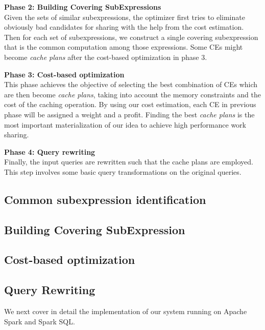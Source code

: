 \textbf{Phase 2: Building Covering SubExpressions}\\
Given the sets of similar subexpressions, the optimizer first tries to eliminate obviously bad candidates for sharing with the help from the cost estimation. Then for each set of subexpressions, we construct a single covering subexpression that is the common computation among those expressions. Some CEs might become \emph{cache plans} after the cost-based optimization in phase 3.

\textbf{Phase 3: Cost-based optimization}\\
This phase achieves the objective of selecting the best combination of CEs which are then become \emph{cache plans}, taking into account the memory constraints and the cost of the caching operation. By using our cost estimation, each CE in previous phase will be assigned a weight and a profit. Finding the best \emph{cache plans} is the most important materialization of our idea to achieve high performance work sharing. 

\textbf{Phase 4: Query rewriting}\\
Finally, the input queries are rewritten such that the cache plans are employed. This step involves some basic query transformations on the original queries.

\subsection{Common subexpression identification}
\label{sec:common_sub}


\subsection{Building Covering SubExpression}
\label{sec:covering_subexpression}


\subsection{Cost-based optimization}
\label{sec:cbo}


\subsection{Query Rewriting}
\label{sec:query_rewriting}


We next cover in detail the implementation of our system running on Apache Spark and Spark SQL.